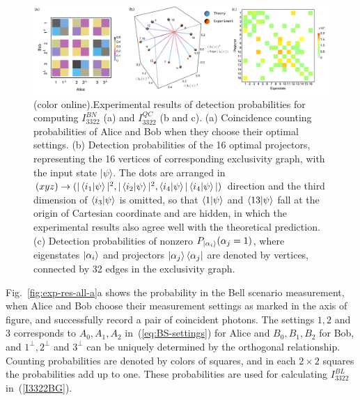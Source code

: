 \documentclass[pra,aps,notitlepage,superscriptaddress,showpacs,showkeys]{revtex4-1}
\theoremstyle{definition}
\theoremstyle{remark}
\begin{document}
   \begin{figure}[tbph]
     \centering
     \includegraphics[width =160mm]{fig/exp-res-all.pdf}
     \caption{(color online).Experimental results of detection probabilities for computing $I_{3322}^{BN}$ (a) and $I_{3322}^{QC}$ (b and c).
     (a) Coincidence counting probabilities of Alice and Bob when they choose their optimal settings.
     \label{fig:exp-res-all-a}
     (b) Detection probabilities of the 16 optimal projectors, representing the 16 vertices of corresponding exclusivity graph, with the input state $|\psi\rangle$.
     The dots are arranged in $(xyz)\to(|\braket{i_1|\psi}|^2, |\braket{i_2|\psi}|^2, \braket{i_4|\psi}|\braket{i_4|\psi}|)$ direction and the third dimension of $\braket{i_3|\psi}$ is omitted, so that $\braket{1|\psi}$ and $\braket{13|\psi}$ fall at the origin of Cartesian coordinate and are hidden, in which the experimental results also agree well with the theoretical prediction.
     \label{fig:exp-res-all-b}
     (c) Detection probabilities of nonzero $P_{\ket{\alpha_i}}(\alpha_j=1)$, where eigenstates $\ket{\alpha_i}$ and projectors $\ket{\alpha_j}\bra{\alpha_j}$ are denoted by vertices, connected by 32 edges in the exclusivity graph.
     \label{fig:exp-res-all-c}
     }
 \end{figure}
 
 Fig.~\ref{fig:exp-res-all-a}a shows the probability in the Bell scenario measurement, when Alice and Bob choose their measurement settings as marked in the axis of figure, and successfully record a pair of coincident photons. 
 The settings $1, 2$ and $3$ corresponds to $A_0, A_1, A_2$ in~(\ref{eq:BS-settings}) for Alice and $B_0, B_1, B_2$ for Bob, and $1^\perp, 2^\perp$ and $3^\perp$ can be uniquely determined by the orthogonal relationship. 
 Counting probabilities are denoted by colors of squares, and in each $2\times2$ squares the probabilities add up to one. These probabilities are used for calculating $I_{3322}^{BL}$ in~(\ref{I3322BG}).
 
\end{document}
